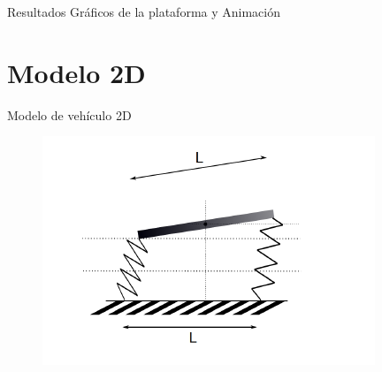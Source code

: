 \documentclass{beamer}
\begin{document}
\begin{frame}{Resultados Gráficos de la plataforma y Animación}
\vskip 1cm
\end{frame}

\section{Modelo 2D}
\begin{frame}{Modelo de vehículo 2D}
 \begin{figure}[h]
\centering
\includegraphics[scale=0.35]{resortes}

\end{figure}

\vskip 1cm
\end{frame}
\end{document}
